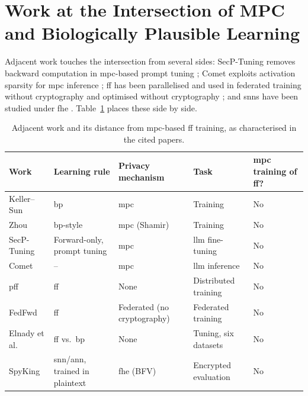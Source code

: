 \section{Work at the Intersection of MPC and Biologically Plausible Learning}\label{sec:lr-intersection}
Adjacent work touches the intersection from several sides: SecP-Tuning removes backward computation in \ac{mpc}-based prompt tuning \cite{luo2026secptuning}; Comet exploits activation sparsity for \ac{mpc} inference \cite{yan2025comet}; \ac{ff} has been parallelised and used in federated training without cryptography \cite{aktemur2025pff,park2023fedfwd} and optimised without cryptography \cite{elnady2026ff}; and \acp{snn} have been studied under \ac{fhe} \cite{nikfam2025spyking}. Table~\ref{tab:lr-adjacent} places these side by side.

\begin{table}[ht]
\centering
\footnotesize
\begin{tabular}{@{}>{\raggedright\arraybackslash}p{2.5cm}>{\raggedright\arraybackslash}p{2.8cm}>{\raggedright\arraybackslash}p{2.6cm}>{\raggedright\arraybackslash}p{2.9cm}>{\raggedright\arraybackslash}p{2.0cm}@{}}
\toprule
Work & Learning rule & Privacy mechanism & Task & \ac{mpc} training of \ac{ff}? \\
\midrule
Keller--Sun \cite{keller2022sqt} & \ac{bp} & \ac{mpc} & Training & No \\
Zhou \cite{zhou2026rmfe} & \ac{bp}-style & \ac{mpc} (Shamir) & Training & No \\
SecP-Tuning \cite{luo2026secptuning} & Forward-only, prompt tuning & \ac{mpc} & \ac{llm} fine-tuning & No \\
Comet \cite{yan2025comet} & -- & \ac{mpc} & \ac{llm} inference & No \\
\ac{pff} \cite{aktemur2025pff} & \ac{ff} & None & Distributed training & No \\
FedFwd \cite{park2023fedfwd} & \ac{ff} & Federated (no cryptography) & Federated training & No \\
Elnady et al.\ \cite{elnady2026ff} & \ac{ff} vs.\ \ac{bp} & None & Tuning, six datasets & No \\
SpyKing \cite{nikfam2025spyking} & \ac{snn}/\ac{ann}, trained in plaintext & \ac{fhe} (BFV) & Encrypted evaluation & No \\
\bottomrule
\end{tabular}
\caption{Adjacent work and its distance from \ac{mpc}-based \ac{ff} training, as characterised in the cited papers.}
\label{tab:lr-adjacent}
\end{table}

